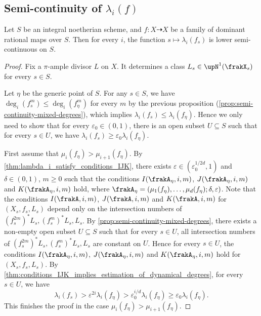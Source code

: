 \subsection[Semi-continuity of dynamical degree]{Semi-continuity of $\lambda_i(f)$}

\begin{theorem}\label{thm:semi-continuity-of-dynamical-degrees}
	Let $S$ be an integral noetherian scheme, and $f: X \dashrightarrow X$ be a family of dominant rational maps over $S$.
	Then for every $i$, the function $s \mapsto \lambda_i(f_s)$ is lower semi-continuous on $S$.
\end{theorem}
\begin{proof}
	Fix a $\pi$-ample divisor $L$ on $X$.
	It determines a class $L_s \in \upN^1(\frakX_s)$ for every $s \in S$.

	Let $\eta$ be the generic point of $S$.
	For any $s \in S$, we have $\deg_i(f_s^m) \leq \deg_i(f_\eta^m)$ for every $m$ by the previous proposition (\cref{prop:semi-continuity-mixed-degrees}), which implies $\lambda_i(f_s) \leq \lambda_i(f_\eta)$.
	Hence we only need to show that for every $\varepsilon_0 \in (0,1)$, there is an open subset $U \subseteq S$ such that for every $s \in U$, we have $\lambda_i(f_s) \geq \varepsilon_0 \lambda_i(f_\eta)$.

	First assume that $\mu_i(f_\eta) > \mu_{i+1}(f_\eta)$.
	By \cref{thm:lambda_i_satisfy_conditions_IJK}, there exists $\varepsilon \in (\varepsilon_0^{1/{2d}}, 1)$ and $\delta \in (0,1)$, $m \geq 0$ such that the conditions $I(\frakA_\eta, i, m)$, $J(\frakA_\eta, i, m)$ and $K(\frakA_\eta, i, m)$ hold, where $\frakA_\eta = (\mu_1(f_\eta), \ldots, \mu_d(f_\eta); \delta, \varepsilon)$.
	Note that the conditions $I(\frakA, i, m)$, $J(\frakA, i, m)$ and $K(\frakA, i, m)$ for $(X_s, f_s, L_s)$ depend only on the intersection numbers of $(f_s^{2m})^*L_s, (f_s^{m})^*L_s, L_s$.
	By \cref{prop:semi-continuity-mixed-degrees}, there exists a non-empty open subset $U \subseteq S$ such that for every $s \in U$, all intersection numbers of $(f_s^{2m})^*L_s, (f_s^{m})^*L_s, L_s$ are constant on $U$.
	Hence for every $s \in U$, the conditions $I(\frakA_\eta, i, m)$, $J(\frakA_\eta, i, m)$ and $K(\frakA_\eta, i, m)$ hold for $(X_s, f_s, L_s)$.
	By \cref{thm:conditions_IJK_implies_estimation_of_dynamical_degrees}, for every $s \in U$, we have
	\[ \lambda_i(f_s) > \varepsilon^{2i} \lambda_i(f_\eta) > \varepsilon_0^{i/d} \lambda_i(f_\eta) \geq \varepsilon_0 \lambda_i(f_\eta). \]
	This finishes the proof in the case $\mu_i(f_\eta) > \mu_{i+1}(f_\eta)$.


\end{proof}

